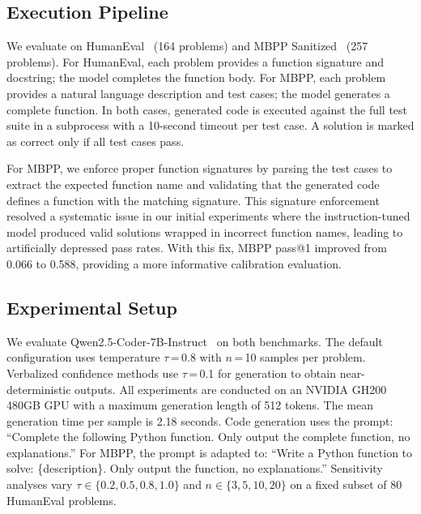 \documentclass{article}
\begin{document}
\subsection{Execution Pipeline}
\label{sec:pipeline}

We evaluate on HumanEval~\citep{chen2021evaluating} (164 problems) and MBPP Sanitized~\citep{austin2021program} (257 problems). For HumanEval, each problem provides a function signature and docstring; the model completes the function body. For MBPP, each problem provides a natural language description and test cases; the model generates a complete function. In both cases, generated code is executed against the full test suite in a subprocess with a 10-second timeout per test case. A solution is marked as correct only if all test cases pass.

For MBPP, we enforce proper function signatures by parsing the test cases to extract the expected function name and validating that the generated code defines a function with the matching signature. This signature enforcement resolved a systematic issue in our initial experiments where the instruction-tuned model produced valid solutions wrapped in incorrect function names, leading to artificially depressed pass rates. With this fix, MBPP pass@1 improved from 0.066 to 0.588, providing a more informative calibration evaluation.

\subsection{Experimental Setup}
\label{sec:setup}

We evaluate Qwen2.5-Coder-7B-Instruct~\citep{hui2024qwen25coder} on both benchmarks. The default configuration uses temperature $\tau$\,=\,0.8 with $n$\,=\,10 samples per problem. Verbalized confidence methods use $\tau$\,=\,0.1 for generation to obtain near-deterministic outputs. All experiments are conducted on an NVIDIA GH200 480GB GPU with a maximum generation length of 512 tokens. The mean generation time per sample is 2.18 seconds. Code generation uses the prompt: ``Complete the following Python function. Only output the complete function, no explanations.'' For MBPP, the prompt is adapted to: ``Write a Python function to solve: \{description\}. Only output the function, no explanations.'' Sensitivity analyses vary $\tau \in \{0.2, 0.5, 0.8, 1.0\}$ and $n \in \{3, 5, 10, 20\}$ on a fixed subset of 80 HumanEval problems.

\end{document}
